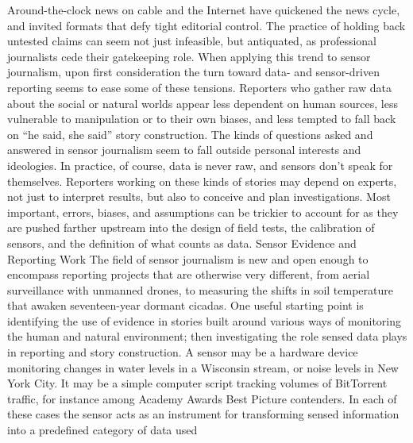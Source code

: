 \begin{itemize}
Around-the-clock news on cable and the Internet have quickened the news
cycle, and invited formats that defy tight editorial control. The practice of
holding back untested claims can seem not just infeasible, but antiquated,
as professional journalists cede their gatekeeping role.
When applying this trend to sensor journalism, upon first consideration the
turn toward data- and sensor-driven reporting seems to ease some of these
tensions. Reporters who gather raw data about the social or natural worlds
appear less dependent on human sources, less vulnerable to manipulation
or to their own biases, and less tempted to fall back on ``he said, she said''
story construction. The kinds of questions asked and answered in sensor
journalism seem to fall outside personal interests and ideologies. In practice,
of course, data is never raw, and sensors don't speak for themselves.
Reporters working on these kinds of stories may depend on experts, not
just to interpret results, but also to conceive and plan investigations. Most
important, errors, biases, and assumptions can be trickier to account for as
they are pushed farther upstream into the design of field tests, the calibration
of sensors, and the definition of what counts as data.
Sensor Evidence and Reporting Work
The field of sensor journalism is new and open enough to encompass
reporting projects that are otherwise very different, from aerial surveillance
with unmanned drones, to measuring the shifts in soil temperature that
awaken seventeen-year dormant cicadas. One useful starting point is identifying
the use of evidence in stories built around various ways of monitoring
the human and natural environment; then investigating the role sensed
data plays in reporting and story construction. A sensor may be a hardware
device monitoring changes in water levels in a Wisconsin stream, or noise
levels in New York City. It may be a simple computer script tracking volumes
of BitTorrent traffic, for instance among Academy Awards Best Picture
contenders. In each of these cases the sensor acts as an instrument for
transforming sensed information into a predefined category of data used


\end{itemize}
